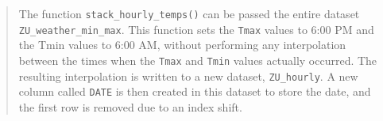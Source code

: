 \documentclass[
]{book}
\newenvironment{Shaded}{\begin{snugshade}}{\end{snugshade}}
\newcommand{\DataTypeTok}[1]{\textcolor[rgb]{0.13,0.29,0.53}{#1}}
\newcommand{\DecValTok}[1]{\textcolor[rgb]{0.00,0.00,0.81}{#1}}
\newcommand{\FloatTok}[1]{\textcolor[rgb]{0.00,0.00,0.81}{#1}}
\newcommand{\KeywordTok}[1]{\textcolor[rgb]{0.13,0.29,0.53}{\textbf{#1}}}
\newcommand{\NormalTok}[1]{#1}
\newcommand{\OperatorTok}[1]{\textcolor[rgb]{0.81,0.36,0.00}{\textbf{#1}}}
\newcommand{\StringTok}[1]{\textcolor[rgb]{0.31,0.60,0.02}{#1}}
\begin{document}
\begin{quote}
The function \texttt{stack\_hourly\_temps()} can be passed the entire dataset \texttt{ZU\_weather\_min\_max}. This function sets the \texttt{Tmax} values to 6:00 PM and the Tmin values to 6:00 AM, without performing any interpolation between the times when the \texttt{Tmax} and \texttt{Tmin} values actually occurred. The resulting interpolation is written to a new dataset, \texttt{ZU\_hourly}. A new column called \texttt{DATE} is then created in this dataset to store the date, and the first row is removed due to an index shift.
\end{quote}

\begin{Shaded}
\end{Shaded}

\begingroup\fontsize{10}{12}\selectfont
\end{document}
